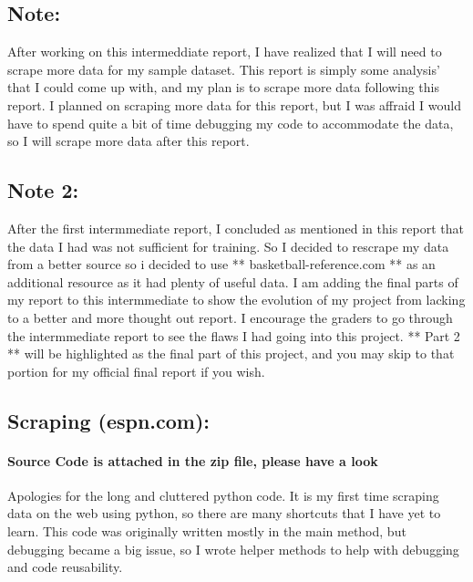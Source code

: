 \documentclass[11pt]{article}
\begin{document}
\subsection{Note:}\label{note}

After working on this intermeddiate report, I have realized that I will
need to scrape more data for my sample dataset. This report is simply
some analysis' that I could come up with, and my plan is to scrape more
data following this report. I planned on scraping more data for this
report, but I was affraid I would have to spend quite a bit of time
debugging my code to accommodate the data, so I will scrape more data
after this report.

\subsection{Note 2:}\label{note-2}

After the first intermmediate report, I concluded as mentioned in this
report that the data I had was not sufficient for training. So I decided
to rescrape my data from a better source so i decided to use **
basketball-reference.com ** as an additional resource as it had plenty
of useful data. I am adding the final parts of my report to this
intermmediate to show the evolution of my project from lacking to a
better and more thought out report. I encourage the graders to go
through the intermmediate report to see the flaws I had going into this
project. ** Part 2 ** will be highlighted as the final part of this
project, and you may skip to that portion for my official final report
if you wish.

\subsection{Scraping (espn.com):}\label{scraping-espn.com}

\paragraph{Source Code is attached in the zip file, please have a
look}\label{source-code-is-attached-in-the-zip-file-please-have-a-look}

    Apologies for the long and cluttered python code. It is my first time
scraping data on the web using python, so there are many shortcuts that
I have yet to learn. This code was originally written mostly in the main
method, but debugging became a big issue, so I wrote helper methods to
help with debugging and code reusability.
\end{document}
